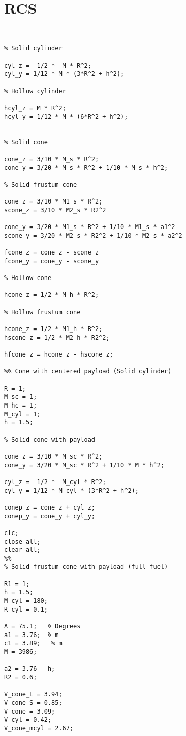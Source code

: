\chapter{RCS}\label{app:SorenMatlab}


\begin{lstlisting}


% Solid cylinder 

cyl_z =  1/2 *  M * R^2;
cyl_y = 1/12 * M * (3*R^2 + h^2);

% Hollow cylinder

hcyl_z = M * R^2;
hcyl_y = 1/12 * M * (6*R^2 + h^2);


% Solid cone

cone_z = 3/10 * M_s * R^2;
cone_y = 3/20 * M_s * R^2 + 1/10 * M_s * h^2;

% Solid frustum cone

cone_z = 3/10 * M1_s * R^2;
scone_z = 3/10 * M2_s * R2^2

cone_y = 3/20 * M1_s * R^2 + 1/10 * M1_s * a1^2
scone_y = 3/20 * M2_s * R2^2 + 1/10 * M2_s * a2^2

fcone_z = cone_z - scone_z
fcone_y = cone_y - scone_y

% Hollow cone

hcone_z = 1/2 * M_h * R^2;

% Hollow frustum cone

hcone_z = 1/2 * M1_h * R^2;
hscone_z = 1/2 * M2_h * R2^2;

hfcone_z = hcone_z - hscone_z;

%% Cone with centered payload (Solid cylinder)

R = 1;
M_sc = 1;
M_hc = 1;
M_cyl = 1;
h = 1.5;

% Solid cone with payload

cone_z = 3/10 * M_sc * R^2;
cone_y = 3/20 * M_sc * R^2 + 1/10 * M * h^2;

cyl_z =  1/2 *  M_cyl * R^2;
cyl_y = 1/12 * M_cyl * (3*R^2 + h^2);

conep_z = cone_z + cyl_z;
conep_y = cone_y + cyl_y;

clc;
close all;
clear all;
%%
% Solid frustum cone with payload (full fuel)

R1 = 1;
h = 1.5;
M_cyl = 180;
R_cyl = 0.1;

A = 75.1;   % Degrees
a1 = 3.76;  % m
c1 = 3.89;   % m
M = 3986;

a2 = 3.76 - h;
R2 = 0.6;

V_cone_L = 3.94; 
V_cone_S = 0.85;
V_cone = 3.09;
V_cyl = 0.42;
V_cone_mcyl = 2.67;


\end{lstlisting}
